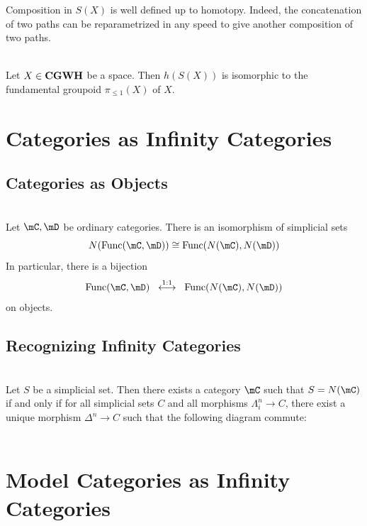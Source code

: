 \documentclass[a4paper]{article}
\begin{document}
Composition in $S(X)$ is well defined up to homotopy. Indeed, the concatenation of two paths can be reparametrized in any speed to give another composition of two paths. 

\begin{prp}{}{}\\ Let $X\in\bold{CGWH}$ be a space. Then $h(S(X))$ is isomorphic to the fundamental groupoid $\pi_{\leq 1}(X)$ of $X$. 
\end{prp}

\pagebreak
\section{Categories as Infinity Categories}
\subsection{Categories as Objects}
\begin{prp}{}{}\\ Let $\mC,\mD$ be ordinary categories. There is an isomorphism of simplicial sets $$N(\text{Func}(\mC,\mD))\cong\text{Func}(N(\mC),N(\mD))$$ In particular, there is a bijection $$\text{Func}(\mC,\mD)\;\;\overset{1:1}{\longleftrightarrow}\;\;\text{Func}(N(\mC),N(\mD))$$ on objects. 
\end{prp}

\subsection{Recognizing Infinity Categories}
\begin{prp}{}{}\\ Let $S$ be a simplicial set. Then there exists a category $\mC$ such that $S=N(\mC)$ if and only if for all simplicial sets $C$ and all morphisms $\Lambda_i^n\to C$, there exist a unique morphism $\Delta^n\to C$ such that the following diagram commute: \\
\\
\end{prp}

\pagebreak
\section{Model Categories as Infinity Categories}
\end{document}
